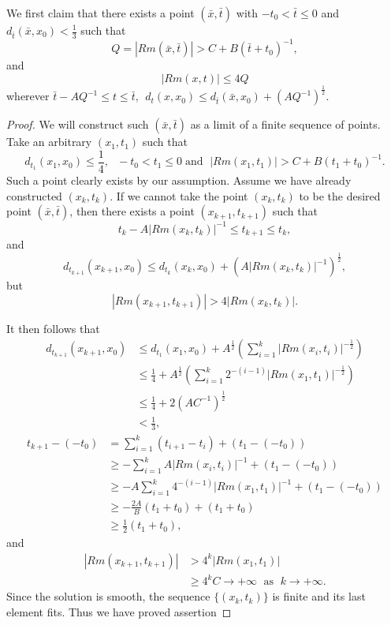 \begin{lemma}
  \label{lem:cz-finite-parabolic-curvature-point-selection}
We first claim that there exists a point $(\bar{x},\bar{t})$ with
$-t_0<\bar{t}\leq 0$ and $d_{\bar{t}}(\bar{x},x_0)<\frac{1}{3}$
such that
$$
Q=|Rm(\bar{x},\bar{t})|>C+ B(\bar{t}+t_0)^{-1},
$$
and \begin{equation}
|Rm(x,t)|\leq 4Q %
\end{equation} wherever $\bar{t}-AQ^{-1}\leq t\leq \bar{t},\ \ d_t(x,x_0)\leq
d_{\bar{t}}(\bar{x},x_0) +(AQ^{-1})^{\frac{1}{2}}.$
\end{lemma}
\begin{proof}
We will construct such $(\bar{x},\bar{t})$ as a limit of a finite
sequence of points.  Take an arbitrary $(x_1,t_1)$ such that
$$
d_{t_1}(x_1,x_0)\leq \frac{1}{4},\ \ \ -t_0<t_1\leq 0 \; \mbox{
and } \;|Rm(x_1,t_1)|>C+B(t_1+t_0)^{-1}.
$$
Such a point clearly exists by our assumption. Assume we have
already constructed $(x_k,t_k).$ If we cannot take the point
$(x_k,t_k)$ to be the desired point $(\bar{x},\bar{t})$, then
there exists a point $(x_{k+1},t_{k+1})$ such that
$$
t_k-A|Rm(x_k,t_k)|^{-1}\leq t_{k+1}\leq t_k,
$$
and
$$
d_{t_{k+1}}(x_{k+1},x_0) \leq
d_{t_{k}}(x_{k},x_0)+(A|Rm(x_k,t_k)|^{-1})^{\frac{1}{2}},
$$
but
$$
|Rm(x_{k+1},t_{k+1})|>4|Rm(x_k,t_k)|.$$

\vskip 0.1cm\noindent It then follows that
\begin{align*}
d_{t_{k+1}}(x_{k+1},x_0)& \leq
d_{t_{1}}(x_{1},x_0)+A^{\frac{1}{2}}
\left(\sum\limits_{i=1}^k|Rm(x_i,t_i)|^{-\frac{1}{2}}\right)\\
&  \leq \frac{1}{4}+A^{\frac{1}{2}}
\left(\sum\limits_{i=1}^k2^{-(i-1)}|Rm(x_1,t_1)|^{-\frac{1}{2}}\right)\\
&  \leq \frac{1}{4}+2(AC^{-1})^{\frac{1}{2}} \\
&  < \frac{1}{3},
\end{align*}
\begin{displaymath}
\begin{split}
t_{k+1}-(-t_0)&  =\sum_{i=1}^k(t_{i+1}-t_i)+(t_1-(-t_0))\\[1mm]
&  \geq-\sum_{i=1}^kA|Rm(x_i,t_i)|^{-1}+(t_1-(-t_0))\\[1mm]
&  \geq-A\sum_{i=1}^k4^{-(i-1)}|Rm(x_1,t_1)|^{-1}+(t_1-(-t_0))\\[1mm]
&  \geq-\frac{2A}{B}(t_1+t_0)+(t_1+t_0)\\[1mm]
&  \geq\frac{1}{2}(t_1+t_0),
\end{split}
\end{displaymath}
and
\begin{align*}
|Rm(x_{k+1},t_{k+1})|&  > 4^k|Rm(x_1,t_1)| \\
&  \geq 4^kC\rightarrow +\infty\; \mbox{ as } \;
k\rightarrow+\infty.
\end{align*}
Since the solution is smooth, the sequence $\{(x_k, t_k)\}$ is
finite and its last element fits. Thus we have proved  assertion
\end{proof}
